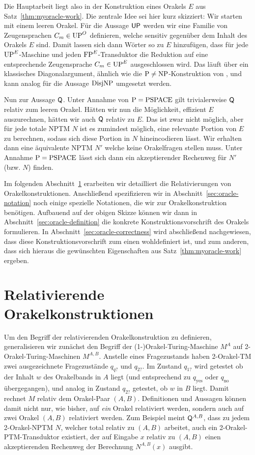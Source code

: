 Die Hauptarbeit liegt also in der Konstruktion eines Orakels $E$ aus Satz~\ref{thm:myoracle-work}.
Die zentrale Idee sei hier kurz skizziert:
Wir starten mit einem leeren Orakel.
Für die Aussage $\mathsf{UP}$ werden wir eine Familie von Zeugensprachen $C_m\in\mathrm{UP}^O$ definieren, welche sensitiv gegenüber dem Inhalt des Orakels $E$ sind.
Damit lassen sich dann Wörter so zu $E$ hinzufügen, dass für jede $\mathrm{UP}^E$-Maschine und jeden $\mathrm{FP}^E$-Transduktor die Reduktion auf eine entsprechende Zeugensprache $C_m\in\mathrm{UP}^E$ ausgeschlossen wird.
Das läuft über ein klassisches Diagonalargument, ähnlich wie die $\mathrm{P}\neq\mathrm{NP}$-Konstruktion von \textcite{baker_relativizations_1975}, und kann analog für die Aussage $\mathrm{DisjNP}$ umgesetzt werden.

Nun zur Aussage $\mathsf{Q}$. Unter Annahme von $\mathrm{P}=\mathrm{PSPACE}$ gilt trivialerweise $\mathsf{Q}$ relativ zum leeren Orakel. 
Hätten wir nun die Möglichkeit, effizient $E$ auszurechnen, hätten wir auch $\mathsf{Q}$ relativ zu $E$.
Das ist zwar nicht möglich, aber für jede totale NPTM $N$ ist es zumindest möglich, eine relevante Portion von $E$ zu berechnen, sodass sich diese Portion in $N$ hineincodieren lässt. Wir erhalten dann eine äquivalente NPTM $N'$ welche keine Orakelfragen stellen muss. Unter Annahme $\mathrm{P}=\mathrm{PSPACE}$ lässt sich dann ein akzeptierender Rechenweg für $N'$ (bzw. $N$) finden.


Im folgenden Abschnitt~\ref{sec:oracle-relativization} erarbeiten wir detailliert die Relativierungen von Orakelkonstruktionen.
Anschließend spezifizieren wir in Abschnitt~\ref{sec:oracle-notation} noch einige spezielle Notationen, die wir zur Orakelkonstruktion benötigen.
Aufbauend auf der obigen Skizze können wir dann in Abschnitt~\ref{sec:oracle-definition} die konkrete Konstruktionsvorschrift des Orakels formulieren.
In Abschnitt~\ref{sec:oracle-correctness} wird abschließend nachgewiesen, dass diese Konstruktionsvorschrift zum einen wohldefiniert ist, und zum anderen, dass sich hieraus die gewünschten Eigenschaften aus Satz~\ref{thm:myoracle-work} ergeben.


\section{Relativierende Orakelkonstruktionen}\label{sec:oracle-relativization}

Um den Begriff der relativierenden Orakelkonstruktion zu definieren, generalisieren wir zunächst den Begriff der (1-)Orakel-Turing-Maschine $M^A$ auf 2-Orakel-Turing-Maschinen $M^{A,B}$. Anstelle eines Fragezustands haben 2-Orakel-TM zwei ausgezeichnete Fragezustände $q_{q?}$ und $q_{2?}$. 
Im Zustand $q_{1?}$ wird getestet ob der Inhalt $w$ des Orakelbands in $A$ liegt (und entsprechend zu $q_{\text{yes}}$ oder $q_{\text{no}}$ übergegangen), und analog in Zustand $q_{2?}$ getestet, ob $w$ in $B$ liegt.
Damit rechnet $M$ relativ dem Orakel-Paar $(A,B)$. 
Definitionen und Aussagen können damit nicht nur, wie bisher, auf \emph{ein} Orakel relativiert werden, sondern auch auf zwei Orakel $(A,B)$ relativiert werden.
Zum Beispiel meint $\mathsf{Q}^{A,B}$, dass zu jedem 2-Orakel-NPTM $N$, welcher total relativ zu $(A,B)$ arbeitet, auch ein 2-Orakel-PTM-Transduktor existiert, der auf Eingabe $x$ relativ zu $(A,B)$ einen akzeptierenden Rechenweg der Berechnung $N^{A,B}(x)$ ausgibt.

